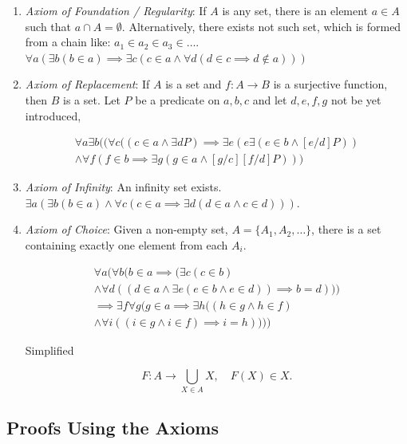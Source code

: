 \begin{enumerate}[label = \Roman*.]
	\item \emph{Axiom of Foundation / Regularity}: If \(A\) is any set, there is an element \(a \in A\) such that \(a \cap A = \emptyset\). Alternatively, there exists not such set,
	      which is formed from a chain like: \(a_1 \in a_2 \in a_3 \in \dots\). \(\forall a (\exists b ( b \in a) \implies \exists c (c \in a \land \forall d ( d \in c \implies d \notin a)))\)

	\item \emph{Axiom of Replacement}: If \(A\) is a set and \(f: A \to B\) is a surjective function, then \(B\) is a set. Let \(P\) be a predicate on \(a, b, c\) and let \(d,e,f,g\) not be yet introduced,

	      \begin{align*}
		      \forall a \exists b ((\forall c((c \in a \land \exists d P) \implies \exists e ( e \exists (e \in b \land [e/d]P)) \\
		      \land \forall f (f \in b \implies \exists g (g \in a \land [g/c][f/d]P)))
	      \end{align*}

	\item \emph{Axiom of Infinity}: An infinity set exists. \(\exists a( \exists b (b \in a) \land \forall c (c \in a \implies \exists d ( d \in a \land c \in d)))\).

	\item \emph{Axiom of Choice}: Given a non-empty set, \(A = \{A_1, A_2, \dots\}\), there is a set containing exactly one element from each \(A_i\).

	      \begin{align*}
		      \forall a (\forall b (b \in a \implies (\exists c ( c \in b)                          \\
		      \land \forall d ((d \in a \land \exists e ( e \in b \land e \in d)) \implies b = d))) \\
		      \implies \exists f \forall g (g \in a \implies \exists h ((h \in g \land h \in f)     \\
		      \land \forall i ((i \in g \land i \in f) \implies i = h))))
	      \end{align*}

	      Simplified

	      \[
		      F: A \to \bigcup_{X \in A} X, \quad F(X) \in X.
	      \]

\end{enumerate}

\subsection{Proofs Using the Axioms}

